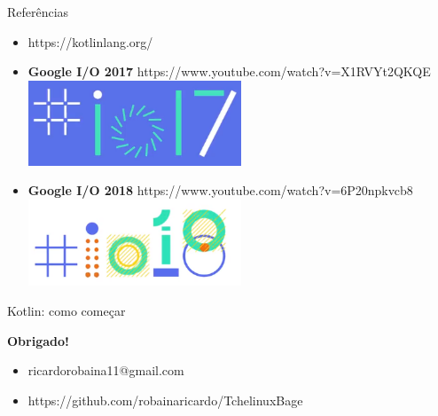 \documentclass{beamer}
\begin{document}
\begin{frame}{Referências}
	
	
			\begin{itemize}
				\item https://kotlinlang.org/
				
				\item \textbf{Google I/O 2017} https://www.youtube.com/watch?v=X1RVYt2QKQE
				\\
				\includegraphics[width=0.5\textwidth]{io17.png}
			
				\item \textbf{Google I/O 2018}  https://www.youtube.com/watch?v=6P20npkvcb8
				\\
				\includegraphics[width=0.5\textwidth]{io18.png}
				
				
			\end{itemize}

	
	
\end{frame}

\begin{frame}{Kotlin: como começar}
	
		\newline
		\begin{center}
			{\Huge  \textbf{Obrigado!} \\}
		\end{center}
		
		{\normalsize 
			\begin{itemize}
				\item ricardorobaina11@gmail.com 
				\item https://github.com/robainaricardo/TchelinuxBage \\ \newline   
			\end{itemize}	
		}
		\maketitle
	
\end{frame}
\end{document}
